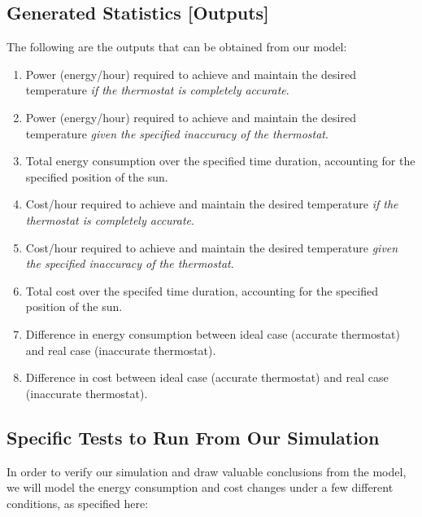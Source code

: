 \documentclass[conference,letterpaper]{IEEEtran}
\begin{document}
\subsection{Generated Statistics [Outputs]}
The following are the outputs that can be obtained from our model:

\begin{enumerate}
    \item Power (energy/hour) required to achieve and maintain the desired temperature \textit{if the thermostat is completely accurate}.
    \item Power (energy/hour) required to achieve and maintain the desired temperature \textit{given the specified inaccuracy of the thermostat}.
    \item Total energy consumption over the specified time duration, accounting for the specified position of the sun.
    \item Cost/hour required to achieve and maintain the desired temperature \textit{if the thermostat is completely accurate}.
    \item Cost/hour required to achieve and maintain the desired temperature \textit{given the specified inaccuracy of the thermostat}.
    \item Total cost over the specifed time duration, accounting for the specified position of the sun.
    \item Difference in energy consumption between ideal case (accurate thermostat) and real case (inaccurate thermostat).
    \item Difference in cost between ideal case (accurate thermostat) and real case (inaccurate thermostat).
\end{enumerate}

\subsection{Specific Tests to Run From Our Simulation}
In order to verify our simulation and draw valuable conclusions from the model, we will model the energy consumption and cost changes under a few different conditions, as specified here:
\end{document}
